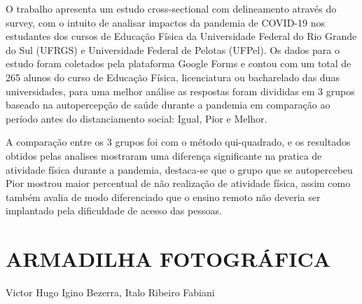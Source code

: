 O trabalho apresenta um estudo  cross-sectional com delineamento através do survey, com o intuito de analisar impactos da pandemia de COVID-19 nos estudantes dos cursos de Educação Física da Universidade Federal do Rio Grande do Sul (UFRGS) e Universidade Federal de Pelotas (UFPel). Os dados para o estudo foram coletados pela plataforma Google Forms e contou com um total de 265 alunos do curso de Educação Física, licenciatura ou bacharelado das duas universidades, para uma melhor análise as respostas foram divididas em 3 grupos baseado na autopercepção de saúde durante a pandemia em comparação ao período antes do distanciamento social: Igual, Pior e Melhor.

A comparação entre os 3 grupos foi com o método qui-quadrado, e os resultados obtidos pelas analises mostraram uma diferença significante na pratica de atividade física durante a pandemia, destaca-se que o grupo que se autopercebeu Pior mostrou maior percentual de não realização de atividade física, assim como também avalia de modo diferenciado que o ensino remoto não deveria ser implantado pela dificuldade de acesso das pessoas. 
 




\section{ARMADILHA FOTOGRÁFICA}

Victor Hugo Igino Bezerra, Italo Ribeiro Fabiani

